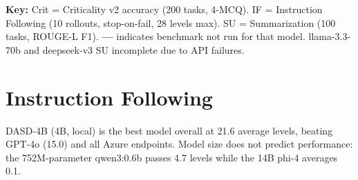 \documentclass[11pt,a4paper]{article}
\begin{document}
\textbf{Key:} Crit = Criticality v2 accuracy (200 tasks, 4-MCQ). IF = Instruction Following (10 rollouts, stop-on-fail, 28 levels max). SU = Summarization (100 tasks, ROUGE-L F1). \textbf{---} indicates benchmark not run for that model. llama-3.3-70b and deepseek-v3 SU incomplete due to API failures.

\section{Instruction Following}

DASD-4B (4B, local) is the best model overall at 21.6 average levels, beating GPT-4o (15.0) and all Azure endpoints. Model size does not predict performance: the 752M-parameter qwen3:0.6b passes 4.7 levels while the 14B phi-4 averages 0.1.
\end{document}
